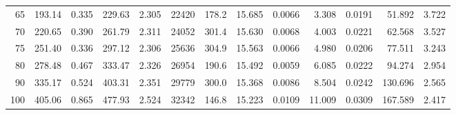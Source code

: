 \documentclass[10pt]{article}
\begin{document}
{\begin{tabular}{|r|rr|rr|rr|rr|rr|r|r|}
       65 &       193.14 &        0.335 &       229.63 &        2.305 &        22420 &        178.2 &       15.685 &       0.0066 &        3.308 &       0.0191 &       51.892 &        3.722 \\
       70 &       220.65 &        0.390 &       261.79 &        2.311 &        24052 &        301.4 &       15.630 &       0.0068 &        4.003 &       0.0221 &       62.568 &        3.527 \\
       75 &       251.40 &        0.336 &       297.12 &        2.306 &        25636 &        304.9 &       15.563 &       0.0066 &        4.980 &       0.0206 &       77.511 &        3.243 \\
       80 &       278.48 &        0.467 &       333.47 &        2.326 &        26954 &        190.6 &       15.492 &       0.0059 &        6.085 &       0.0222 &       94.274 &        2.954 \\
       90 &       335.17 &        0.524 &       403.31 &        2.351 &        29779 &        300.0 &       15.368 &       0.0086 &        8.504 &       0.0242 &      130.696 &        2.565 \\
      100 &       405.06 &        0.865 &       477.93 &        2.524 &        32342 &        146.8 &       15.223 &       0.0109 &       11.009 &       0.0309 &      167.589 &        2.417 \\
\hline
\end{tabular}
}







\pagebreak
\end{document}
